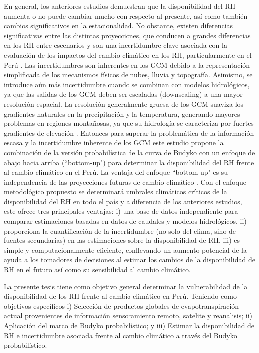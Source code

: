\documentclass[12pt]{article}
\begin{document}
En general, los anteriores estudios demuestran que la disponibilidad del RH aumenta o no puede cambiar mucho con respecto al presente, así como también cambios significativos en la estacionalidad. No obstante, existen diferencias significativas entre las distintas proyecciones, que conducen a grandes diferencias en los RH entre escenarios \citep{Vuille2008} y son una incertidumbre clave asociada con la evaluación de los impactos del cambio climático en los RH, particularmente en el Perú \citep{VanSoesbergen2016}. Las incertidumbres son inherentes en los GCM debido a la representación simplificada de los mecanismos físicos de nubes, lluvia y topografía. Asimismo, se introduce aún más incertidumbre cuando se combinan con modelos hidrológicos, ya que las salidas de los GCM deben ser escaladas (downscaling) a una mayor resolución espacial. La resolución generalmente gruesa de los GCM suaviza los gradientes naturales en la precipitación y la temperatura, generando mayores problemas en regiones montañosas, ya que su hidrología se caracteriza por fuertes gradientes de elevación \citep{Buytaert2010}. Entonces para superar la problemática de la información escasa y la incertidumbre inherente de los GCM este estudio propone la combinación de la versión probabilística de la curva de Budyko \citep{Singh2015,Greve2015} con un enfoque de abajo hacia arriba (``bottom-up") para determinar la disponibilidad del RH frente al cambio climático en el Perú. La ventaja del enfoque ``bottom-up" es su independencia de las proyecciones futuras de cambio climático \citep{Singh2014,Poff2016}. Con el enfoque metodológico propuesto se determinará umbrales climáticos críticos de la disponibilidad del RH en todo el país y a diferencia de los anteriores estudios, este ofrece tres principales ventajas: i) una base de datos independiente para comparar estimaciones basadas en datos de caudales y modelos hidrológicos, ii) proporciona la cuantificación de la incertidumbre (no solo del clima, sino de fuentes secundarias) en las estimaciones sobre la disponibilidad de RH, iii) es simple y computacionalmente eficiente, conllevando un aumento potencial de la ayuda a los tomadores de decisiones al estimar los cambios de la disponibilidad de RH en el futuro así como su sensibilidad al cambio climático.

La presente tesis tiene como objetivo general determinar la vulnerabilidad de la disponibilidad de los RH frente al cambio climático en Perú. Teniendo como objetivos específicos i) Selección de productos globales de evapotranspiración actual provenientes de información sensoramiento remoto, satelite y reanalisis; ii) Aplicación del marco de Budyko probabilístico; y iii) Estimar la disponibilidad de RH e incertidumbre asociada frente al cambio climático a través del Budyko probabilístico.
\end{document}
